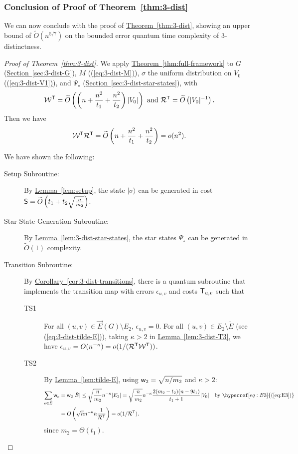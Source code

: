 \documentclass{theoretics}
\newcommand{\eq}[1]{\hyperref[eq:#1]{(\ref*{eq:#1})}}
\renewcommand{\sec}[1]{\hyperref[sec:#1]{Section~\ref*{sec:#1}}}
\newcommand{\thm}[1]{\hyperref[thm:#1]{Theorem~\ref*{thm:#1}}}
\newcommand{\lem}[1]{\hyperref[lem:#1]{Lemma~\ref*{lem:#1}}}
\newcommand{\cor}[1]{\hyperref[cor:#1]{Corollary~\ref*{cor:#1}}}
\def\ket#1{{\lvert}#1\rangle}
\renewcommand{\>}{\rangle}
\newcommand{\<}{\langle}
\renewcommand{\(}{\left(}
\renewcommand{\)}{\right)}
\def\w{{\sf w}}
\begin{document}
\subsubsection{Conclusion of Proof of Theorem~\ref{thm:3-dist}}

We can now conclude with the proof of \thm{3-dist}, showing an upper bound of $\widetilde{O}(n^{5/7})$ on the bounded error quantum time complexity of $3$-distinctness. 

\begin{proof}[Proof of Theorem~\ref{thm:3-dist}]
We apply \thm{full-framework} to $G$ (\sec{3-dist-G}), $M$ (\eq{3-dist-M}),  $\sigma$ the uniform distribution on $V_0$ (\eq{3-dist-V1}), and $\Psi_\star$ (\sec{3-dist-star-states}), with 
$${\cal W}^{\sf T}=\widetilde{O}\left(\left(n + \frac{n^2}{t_1} +\frac{n^2}{t_2}\right)|V_0|\right)
\mbox{ and }
{\cal R}^{\sf T}=\widetilde{O}\left(|V_0|^{-1} \right).$$
Then we have
$${\cal W}^{\sf T}{\cal R}^{\sf T} = \widetilde{O}\left(n + \frac{n^2}{t_1} +\frac{n^2}{t_2}\right)= o(n^2).$$

\noindent We have shown the following:
\begin{description}
\item[Setup Subroutine:] By \lem{setup}, the state $\ket{\sigma}$ can be generated in cost ${\sf S}=\widetilde{O}\left(t_1+t_2\sqrt{\frac{n}{m_2}}\right)$.
\item[Star State Generation Subroutine:] By \lem{3-dist-star-states}, the star states ${\Psi_\star}$ can be generated in $\widetilde{O}(1)$ complexity.
\item[Transition Subroutine:] By \cor{3-dist-transitions}, there is a quantum subroutine that implements the transition map with errors $\epsilon_{u,v}$ and costs ${\sf T}_{u,v}$ such that
\begin{description}
\item[TS1] For all $(u,v)\in \overrightarrow{E}(G)\setminus E_2$, $\epsilon_{u,v}=0$. For all $(u,v)\in E_2\setminus\tilde{E}$ (see \eq{3-dist-tilde-E}), taking $\kappa>2$ in \lem{3-dist-T3}, we have $\epsilon_{u,v}
=O(n^{-\kappa})=o(1/({\cal R}^{\sf T}{\cal W}^{\sf T}))$.
\item[TS2] By \lem{tilde-E}, using $\w_2=\sqrt{n/m_2}$ and $\kappa>2$:
\begin{align*}
\sum_{e\in \tilde{E}}\w_e &= \w_2|\tilde{E}| \leq \sqrt{\frac{n}{m_2}}n^{-\kappa}|E_2| = \sqrt{\frac{n}{m_2}}n^{-\kappa}\frac{2(m_2-t_2)(n-9t_1)}{t_1+1}|V_0| &\mbox{by }\eq{E3}\\
&= {O}\left(\sqrt{n}n^{-\kappa}n\frac{1}{{\cal R}^{\sf T}}\right) = o(1/{\cal R}^{\sf T}). 
\end{align*}
since $m_2=\Theta(t_1)$.


\end{description}
\end{description}
\end{proof}
\end{document}
